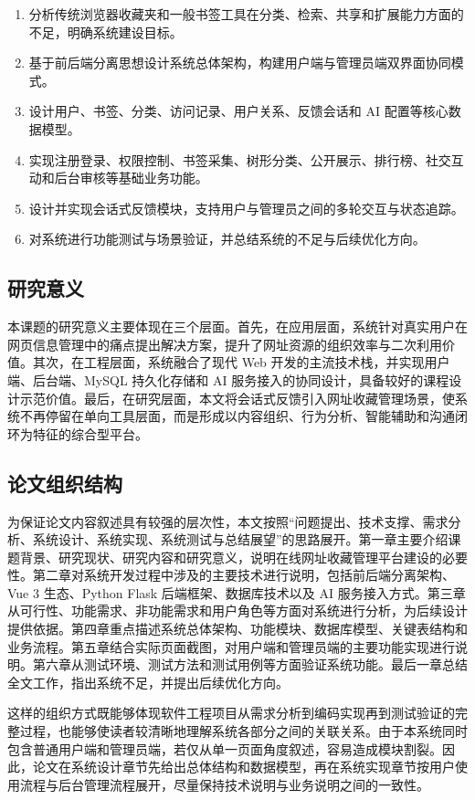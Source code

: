 \documentclass[12pt,a4paper]{ctexart}
\begin{document}
\begin{enumerate}[label=\arabic.]
    \item 分析传统浏览器收藏夹和一般书签工具在分类、检索、共享和扩展能力方面的不足，明确系统建设目标。
    \item 基于前后端分离思想设计系统总体架构，构建用户端与管理员端双界面协同模式。
    \item 设计用户、书签、分类、访问记录、用户关系、反馈会话和 AI 配置等核心数据模型。
    \item 实现注册登录、权限控制、书签采集、树形分类、公开展示、排行榜、社交互动和后台审核等基础业务功能。
    \item 设计并实现会话式反馈模块，支持用户与管理员之间的多轮交互与状态追踪。
    \item 对系统进行功能测试与场景验证，并总结系统的不足与后续优化方向。
\end{enumerate}

\subsection{研究意义}
本课题的研究意义主要体现在三个层面。首先，在应用层面，系统针对真实用户在网页信息管理中的痛点提出解决方案，提升了网址资源的组织效率与二次利用价值。其次，在工程层面，系统融合了现代 Web 开发的主流技术栈，并实现用户端、后台端、MySQL 持久化存储和 AI 服务接入的协同设计，具备较好的课程设计示范价值。最后，在研究层面，本文将会话式反馈引入网址收藏管理场景，使系统不再停留在单向工具层面，而是形成以内容组织、行为分析、智能辅助和沟通闭环为特征的综合型平台。


\subsection{论文组织结构}
为保证论文内容叙述具有较强的层次性，本文按照“问题提出、技术支撑、需求分析、系统设计、系统实现、系统测试与总结展望”的思路展开。第一章主要介绍课题背景、研究现状、研究内容和研究意义，说明在线网址收藏管理平台建设的必要性。第二章对系统开发过程中涉及的主要技术进行说明，包括前后端分离架构、Vue 3 生态、Python Flask 后端框架、数据库技术以及 AI 服务接入方式。第三章从可行性、功能需求、非功能需求和用户角色等方面对系统进行分析，为后续设计提供依据。第四章重点描述系统总体架构、功能模块、数据库模型、关键表结构和业务流程。第五章结合实际页面截图，对用户端和管理员端的主要功能实现进行说明。第六章从测试环境、测试方法和测试用例等方面验证系统功能。最后一章总结全文工作，指出系统不足，并提出后续优化方向。

这样的组织方式既能够体现软件工程项目从需求分析到编码实现再到测试验证的完整过程，也能够使读者较清晰地理解系统各部分之间的关联关系。由于本系统同时包含普通用户端和管理员端，若仅从单一页面角度叙述，容易造成模块割裂。因此，论文在系统设计章节先给出总体结构和数据模型，再在系统实现章节按用户使用流程与后台管理流程展开，尽量保持技术说明与业务说明之间的一致性。
\end{document}
